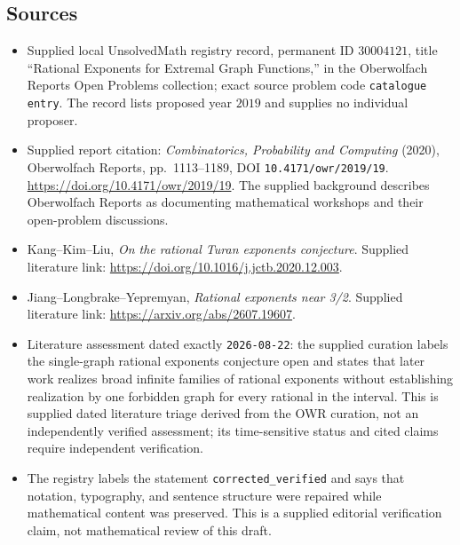 \documentclass[11pt]{article}
\begin{document}
\subsection{Sources}
\begin{itemize}
\item Supplied local UnsolvedMath registry record, permanent ID \(30004121\), title ``Rational Exponents for Extremal Graph Functions,'' in the Oberwolfach Reports Open Problems collection; exact source problem code \texttt{catalogue entry}. The record lists proposed year \(2019\) and supplies no individual proposer.
\item Supplied report citation: \emph{Combinatorics, Probability and Computing} (2020), Oberwolfach Reports, pp.~1113--1189, DOI \texttt{10.4171/owr/2019/19}. \url{https://doi.org/10.4171/owr/2019/19}. The supplied background describes Oberwolfach Reports as documenting mathematical workshops and their open-problem discussions.
\item Kang--Kim--Liu, \emph{On the rational Turan exponents conjecture}. Supplied literature link: \url{https://doi.org/10.1016/j.jctb.2020.12.003}.
\item Jiang--Longbrake--Yepremyan, \emph{Rational exponents near 3/2}. Supplied literature link: \url{https://arxiv.org/abs/2607.19607}.
\item Literature assessment dated exactly \texttt{2026-08-22}: the supplied curation labels the single-graph rational exponents conjecture open and states that later work realizes broad infinite families of rational exponents without establishing realization by one forbidden graph for every rational in the interval. This is supplied dated literature triage derived from the OWR curation, not an independently verified assessment; its time-sensitive status and cited claims require independent verification.
\item The registry labels the statement \texttt{corrected\_verified} and says that notation, typography, and sentence structure were repaired while mathematical content was preserved. This is a supplied editorial verification claim, not mathematical review of this draft.
\end{itemize}
\end{document}
